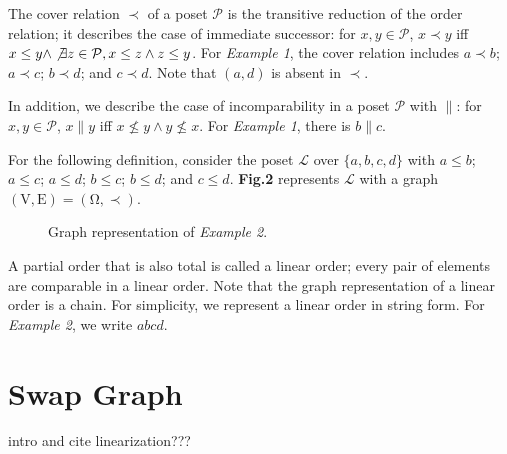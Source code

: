 \documentclass{llncs}
\begin{document}
The cover relation $\prec$ of a poset $\mathcal{P}$ is the transitive reduction of the order relation; it describes the case of immediate successor: for $x, y \in \mathcal{P}$, $x \prec y$ iff $x \leq y \wedge \not\exists z \in \mathcal{P}, x \leq z \wedge z \leq y$. For \textit{Example 1}, the cover relation includes $a \prec b$; $a \prec c$; $b \prec d$; and $c \prec d$. Note that $(a, d)$ is absent in $\prec$.

In addition, we describe the case of incomparability in a poset $\mathcal{P}$ with $\parallel$: for $x, y \in \mathcal{P}$, $x \parallel y$ iff $x \not\leq y \wedge y \not\leq x$. For \textit{Example 1}, there is $b \parallel c$.


\begin{example}
    For the following definition, consider the poset $\mathcal{L}$ over $\{a,b,c,d\}$ with $a \leq b$; $a \leq c$; $a \leq d$; $b \leq c$; $b \leq d$; and $c \leq d$. \textbf{Fig.2} represents $\mathcal{L}$ with a graph $(\mathrm{V},\mathrm{E}) = (\mathrm{\Omega},\prec)$.
\end{example}

\begin{figure}
\centering
\vspace{1cm}
\caption{Graph representation of \textit{Example 2}.}
\end{figure}

A partial order that is also total is called a linear order; every pair of elements are comparable in a linear order. Note that the graph representation of a linear order is a chain. For simplicity, we represent a linear order in string form. For \textit{Example 2}, we write $abcd$.

\section{Swap Graph}
intro and cite linearization???
\end{document}
